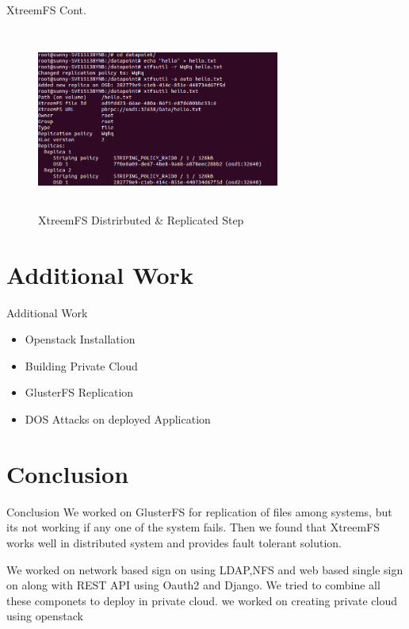 \documentclass[10pt,xcolor=dvipsnames]{beamer}
\begin{document}
\begin{frame}{XtreemFS Cont.}

\begin{figure}[H]
\begin{center}
\includegraphics[width=8cm,height=6cm]{OSD1.png}
\caption{XtreemFS Distrirbuted \& Replicated Step}
\end{center}
\end{figure}

\end{frame}

\section{Additional Work}
\begin{frame}{Additional Work}
\begin{itemize}
\item Openstack Installation
\item Building Private Cloud
\item GlusterFS Replication
\item DOS Attacks on deployed Application
\end{itemize}
\end{frame}

\section{Conclusion} 
\begin{frame}{Conclusion}
We worked on GlusterFS for replication of files among systems, but its not working if any one of the system fails. Then we found that XtreemFS works well in distributed system and provides fault tolerant solution. \newline

We worked on network based sign on using LDAP,NFS and web based single sign on along with REST API using Oauth2 and Django. We tried to combine all these componets to deploy in private cloud. we worked on creating private cloud using openstack \newline
\end{frame}
\end{document}
